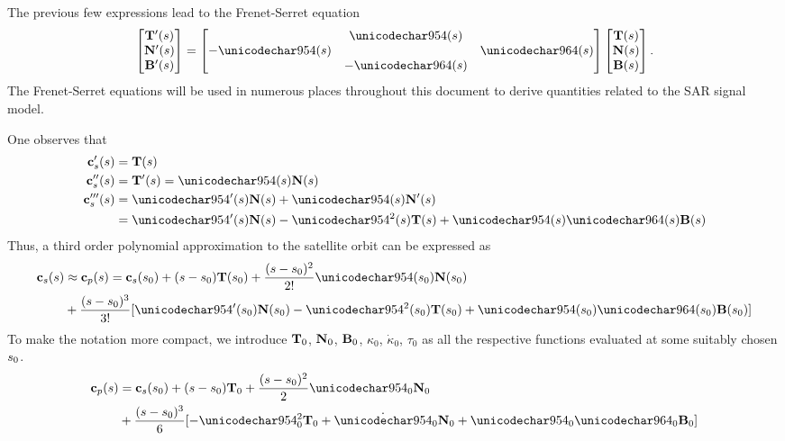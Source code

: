 The previous few expressions lead to the Frenet-Serret equation
\begin{equation}
 \begin{bmatrix}\vct{T}'(\parm)\\\vct{N}'(\parm)\\\vct{B}'(\parm)\end{bmatrix}
 =
 \begin{bmatrix}
  &\kappa(\parm)&\\
  -\kappa(\parm)&&\tau(\parm)\\
  &-\tau(\parm)&
 \end{bmatrix}
 \begin{bmatrix}\vct{T}(\parm)\\\vct{N}(\parm)\\\vct{B}(\parm)\end{bmatrix}.
 \label{eq:FrenetSerret}
\end{equation}
The Frenet-Serret equations will be used in numerous places throughout this document to derive quantities related to the SAR signal model.
\par
One observes that
\begin{equation}
\begin{split}
 \sats'(\parm) &= \vct{T}(\parm)\\
 \sats''(\parm) &= \vct{T}'(\parm) = \kappa(\parm)\vct{N}(\parm)\\
 \sats'''(\parm) &= \kappa'(\parm)\vct{N}(\parm) + \kappa(\parm)\vct{N}'(\parm)\\
 &= \kappa'(\parm)\vct{N}(\parm) -\kappa^2(\parm)\vct{T}(\parm)+\kappa(\parm)\tau(\parm)\vct{B}(\parm)
\end{split}
\end{equation}
Thus, a third order polynomial approximation to the satellite orbit can be expressed as
\begin{equation}
\begin{split}
 \sats(\parm)&\approx\satp(\parm) = \sats(\parm_0) + (s-\parm_0)\vct{T}(\parm_0) + \frac{(s-\parm_0)^2}{2!}\kappa(\parm_0)\vct{N}(\parm_0)\\
 &+ \frac{(s-\parm_0)^3}{3!}[\kappa'(\parm_0)\vct{N}(\parm_0) -\kappa^2(\parm_0)\vct{T}(\parm_0)+\kappa(\parm_0)\tau(\parm_0)\vct{B}(\parm_0)]
\end{split}
\end{equation}
To make the notation more compact, we introduce $\mathbf{T}_0$, $\mathbf{N}_0$, $\mathbf{B}_0$, $\kappa_0$, $\dot{\kappa}_0$, $\tau_0$ as all the respective functions evaluated at some suitably chosen $s_0$.
\begin{equation}
\begin{split}
 \satp(\parm) &= \sats(\parm_0) + (\parm-\parm_0)\vct{T}_0 +  \frac{(\parm-\parm_0)^2}{2}\kappa_0\vct{N}_0\\
 &+ \frac{(\parm-\parm_0)^3}{6}[-\kappa^2_0\vct{T}_0 + \dot{\kappa}_0\vct{N}_0 + \kappa_0\tau_0\vct{B}_0]
 \end{split}
 \label{eq:diffgeoeqn}
\end{equation}
